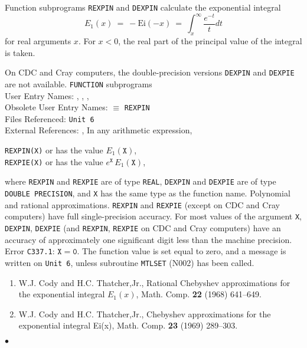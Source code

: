                     
               
\Submitter{}                          
                     
Function subprograms {\tt REXPIN} and {\tt DEXPIN}
calculate the exponential integral
$$ E_1(x) \ = \ -\mathrm{Ei}(-x) \ = \
\int^{\infty}_x\frac{e^{-t}}{t}dt $$
for real arguments $x$. For $x<0$, the real part of the principal
value of the integral is taken.
\par
On CDC and Cray computers, the double-precision versions
{\tt DEXPIN} and {\tt DEXPIE} are not available.
\Structure
{\tt FUNCTION} subprograms \\
User Entry Names: , ,
, \\
Obsolete User Entry Names:  $\equiv$ {\tt REXPIN} \\
Files Referenced: {\tt Unit 6} \\
External References: , 
\Usage
In any arithmetic expression,
\begin{center}
\parbox{.7\textwidth}{
{\tt REXPIN(X)} \quad or  \quad has the value
\quad $E_1(\mathtt{X})$, \\
{\tt REXPIE(X)} \quad or  \quad has the value
\quad $e^{\mathtt{X}}\,E_1(\mathtt{X})$,}
\end{center}
where {\tt REXPIN} and {\tt REXPIE} are of type {\tt REAL},
{\tt DEXPIN} and {\tt DEXPIE} are of type
{\tt DOUBLE PRECISION}, and {\tt X} has the same type as the
function name.
\Method
Polynomial and rational approximations.
\Accuracy
{\tt REXPIN} and {\tt REXPIE} (except on CDC and Cray computers)
have full single-precision accuracy.
For most values of the argument {\tt X}, {\tt DEXPIN}, {\tt DEXPIE}
(and {\tt REXPIN}, {\tt REXPIE} on CDC and Cray computers) have an
accuracy of
approximately one significant digit less than the machine precision.
\Errorh
Error {\tt C337.1}: $\mathtt{X=0}$.
The function value is set equal to zero, and a message is written on
{\tt Unit 6}, unless subroutine {\tt MTLSET} (N002) has been called.
\Refer
\begin{enumerate}
\item  W.J. Cody and H.C. Thatcher,Jr., Rational
Chebyshev approximations for the exponential integral $E_1(x)$,
Math. Comp. {\bf 22} (1968) 641--649.
\item  W.J. Cody and H.C. Thatcher,Jr., Chebyshev
approximations for the exponential integral Ei(x), Math. Comp. {\bf 23}
(1969) 289--303.
\end{enumerate}
$\bullet$
